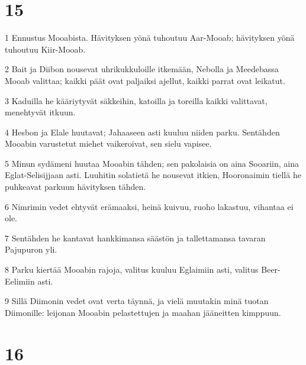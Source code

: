 \chapter{15}

\par 1 Ennustus Mooabista. Hävityksen yönä tuhoutuu Aar-Mooab; hävityksen yönä tuhoutuu Kiir-Mooab.
\par 2 Bait ja Diibon nousevat uhrikukkuloille itkemään, Nebolla ja Meedebassa Mooab valittaa; kaikki päät ovat paljaiksi ajellut, kaikki parrat ovat leikatut.
\par 3 Kaduilla he kääriytyvät säkkeihin, katoilla ja toreilla kaikki valittavat, menehtyvät itkuun.
\par 4 Hesbon ja Elale huutavat; Jahaaseen asti kuuluu niiden parku. Sentähden Mooabin varustetut miehet vaikeroivat, sen sielu vapisee.
\par 5 Minun sydämeni huutaa Mooabin tähden; sen pakolaisia on aina Sooariin, aina Eglat-Selisijjaan asti. Luuhitin solatietä he nousevat itkien, Hooronaimin tiellä he puhkeavat parkuun hävityksen tähden.
\par 6 Nimrimin vedet ehtyvät erämaaksi, heinä kuivuu, ruoho lakastuu, vihantaa ei ole.
\par 7 Sentähden he kantavat hankkimansa säästön ja tallettamansa tavaran Pajupuron yli.
\par 8 Parku kiertää Mooabin rajoja, valitus kuuluu Eglaimiin asti, valitus Beer-Eelimiin asti.
\par 9 Sillä Diimonin vedet ovat verta täynnä, ja vielä muutakin minä tuotan Diimonille: leijonan Mooabin pelastettujen ja maahan jääneitten kimppuun.

\chapter{16}

